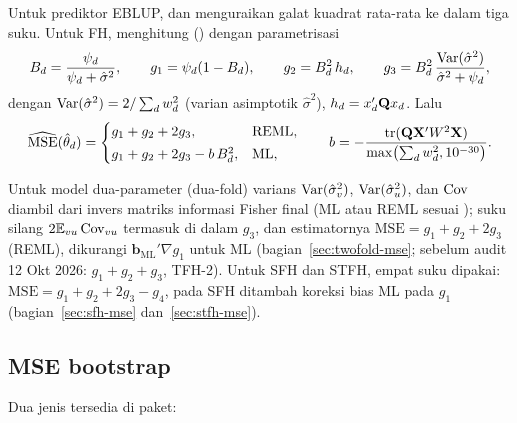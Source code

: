 Untuk prediktor EBLUP, \citet{prasad1990estimation} dan
\citet{kackar1984approximations} menguraikan galat kuadrat rata-rata ke dalam
tiga suku. Untuk FH,  menghitung ()
dengan parametrisasi
\begin{equation}
  B_d=\frac{\psi_d}{\psi_d+\hat\sigma^2},
  \qquad
  g_1=\psi_d(1-B_d),
  \qquad
  g_2=B_d^2\,h_d,
  \qquad
  g_3=B_d^2\,\frac{\operatorname{Var}(\hat\sigma^{2})}{\hat\sigma^2+\psi_d},
  \label{eq:g1g2g3}
\end{equation}
dengan $\operatorname{Var}(\hat\sigma^{2})=2/\sum_d w_d^2$ (varian asimptotik $\hat\sigma^2$), $h_d=x_d'
\mathbf{Q} x_d$. Lalu
\begin{equation}
  \widehat{\mathrm{MSE}}(\hat\theta_d)=
  \begin{cases}
    g_1+g_2+2g_3, & \text{REML},\\[2pt]
    g_1+g_2+2g_3-b\,B_d^2, & \text{ML},
  \end{cases}
  \qquad
  b=-\frac{\operatorname{tr}(\mathbf{Q}\mathbf{X}'W^2\mathbf{X})}{\max\bigl(\sum_d w_d^2,10^{-30}\bigr)}.
  \label{eq:mse-fh}
\end{equation}

Untuk model dua-parameter (dua-fold) varians $\operatorname{Var}(\hat\sigma_v^2)$,
$\operatorname{Var}(\hat\sigma_u^2)$, dan $\operatorname{Cov}$ diambil dari invers matriks informasi Fisher
final (ML atau REML sesuai ); suku silang $2\mathbb{E}_{vu}\operatorname{Cov}_{vu}$
termasuk di dalam $g_3$, dan estimatornya $\mathrm{MSE}=g_1+g_2+2g_3$ (REML),
dikurangi $\mathbf b_{\text{ML}}'\nabla g_1$ untuk ML (bagian~\ref{sec:twofold-mse};
sebelum audit 12 Okt 2026: $g_1+g_2+g_3$, TFH-2). Untuk SFH dan STFH, empat
suku dipakai: $\mathrm{MSE}=g_1+g_2+2g_3-g_4$, pada SFH ditambah koreksi bias
ML pada $g_1$ (bagian~\ref{sec:sfh-mse} dan~\ref{sec:stfh-mse}).

\subsection{MSE bootstrap}\label{sec:bootstrap}

Dua jenis tersedia di paket:


